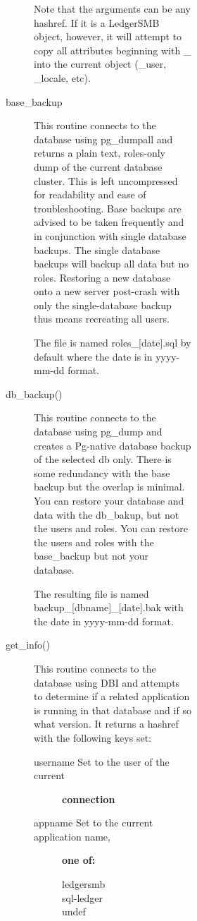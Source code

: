 \begin{description}
\begin{description}
\begin{description}
\begin{description}
\begin{description}
\begin{description}
\begin{description}
Note that the arguments can be any hashref. If it is a LedgerSMB object,
however, it will attempt to copy all attributes beginning with \_ into the 
current object (\_user, \_locale, etc).


\item[{base\_backup}] \mbox{}

This routine connects to the database using pg\_dumpall and returns a plain text,
roles-only dump of the current database cluster.  This is left uncompressed for
readability and ease of troubleshooting.  Base backups are advised to be taken
frequently and in conjunction with single database backups.  The single database
backups will backup all data but no roles.  Restoring a new database onto a new
server post-crash with only the single-database backup thus means recreating all
users.



The file is named roles\_[date].sql by default where the date is in
yyyy-mm-dd format.


\item[{db\_backup()}] \mbox{}

This routine connects to the database using pg\_dump and creates a Pg-native 
database backup of the selected db only.  There is some redundancy with the base
backup but the overlap is minimal.  You can restore your database and data with
the db\_bakup, but not the users and roles.  You can restore the users and roles
with the base\_backup but not your database.



The resulting file is named backup\_[dbname]\_[date].bak with the date in
yyyy-mm-dd format.


\item[{get\_info()}] \mbox{}

This routine connects to the database using DBI and attempts to determine if a 
related application is running in that database and if so what version.  
It returns a hashref with the following keys set:

\begin{description}

\item[{username Set to the user of the current}] \textbf{connection}
\item[{appname Set to the current application name,}] \textbf{one of:}\begin{description}

\item[{ledgersmb}] \mbox{}
\item[{sql-ledger}] \mbox{}
\item[{undef}] \mbox{}\end{description}


\end{description}
\end{description}
\end{description}
\end{description}
\end{description}
\end{description}
\end{description}
\end{description}
